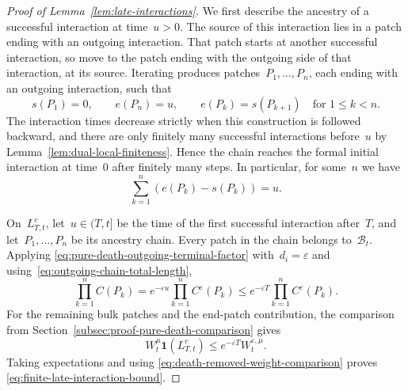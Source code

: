 \documentclass[EJP,preprint,NODS,nobera]{ejpecp}
\newcommand{\bb}[1]{\left(#1\right)}
\newcommand{\ind}{\mathbf{1}}
\begin{document}
\begin{proof}[Proof of Lemma~\ref{lem:late-interactions}]
We first describe the ancestry of a successful interaction at time~$u>0$.
The source of this interaction lies in a patch ending with an outgoing
interaction. That patch starts at another successful interaction, so move to
the patch ending with the outgoing side of that interaction, at its source.
Iterating produces patches~$P_1,\ldots,P_n$, each ending with an outgoing
interaction, such that
\begin{equation*}
s(P_1)=0,
\qquad
e(P_n)=u,
\qquad
e(P_k)=s(P_{k+1})
\quad\text{for }1\leq k<n.
\end{equation*}
The interaction times decrease strictly when this construction is followed
backward, and there are only finitely many successful interactions before~$u$
by Lemma~\ref{lem:dual-local-finiteness}. Hence the chain reaches the formal
initial interaction at time~$0$ after finitely many steps. In particular, for some~$n$ we have
\begin{equation}
\label{eq:outgoing-chain-total-length}
\sum_{k=1}^n\bb{e(P_k)-s(P_k)}
=
u.
\end{equation}



On~$L_{T,t}^c$, let~$u\in(T,t]$ be the time of the first successful interaction
after~$T$, and let~$P_1,\ldots,P_n$ be its ancestry chain. Every patch in the
chain belongs to~$\mathcal B_t$. Applying
\eqref{eq:pure-death-outgoing-terminal-factor} with~$d_i=\varepsilon$ and
using~\eqref{eq:outgoing-chain-total-length},
\begin{equation*}
\prod_{k=1}^n C(P_k)
=
e^{-\varepsilon u}
\prod_{k=1}^n C^\varepsilon(P_k)
\leq
e^{-\varepsilon T}
\prod_{k=1}^n C^\varepsilon(P_k).
\end{equation*}
For the remaining bulk patches and the end-patch contribution, the comparison
from Section~\ref{subsec:proof-pure-death-comparison} gives
\begin{equation*}
W_t^\mu\ind\bb{L_{T,t}^c}
\leq
e^{-\varepsilon T}
W_t^{\varepsilon,\mu}.
\end{equation*}
Taking expectations and using
\eqref{eq:death-removed-weight-comparison} proves
\eqref{eq:finite-late-interaction-bound}.


\end{proof}
\end{document}
